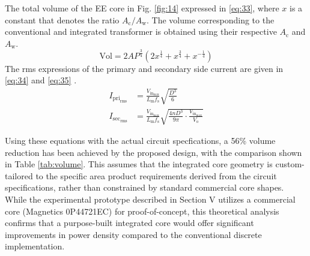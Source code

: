 \documentclass[lettersize,journal]{IEEEtran}
\begin{document}
The total volume of the EE core in Fig. \ref{fig:14} expressed in \eqref{eq:33}, where $x$ is a constant that denotes the ratio $A_{\mathrm{c}}/A_{\mathrm{w}}$. The volume corresponding to the conventional and integrated transformer is obtained using their respective $A_{\mathrm{c}}$ and $A_{\mathrm{w}}$.
\begin{equation}
\label{eq:33}
\mathrm{Vol} = 2 AP^{\frac{3}{4}} (2 x^{\frac{1}{4}} + x^{\frac{3}{4}} + x^{-\frac{1}{4}})
\end{equation}
The rms expressions of the primary and secondary side current are given in \eqref{eq:34} and \eqref{eq:35} \cite{ref8}.
\begin{align}
I_{\mathrm{pri}_{\mathrm{rms}}} &= \frac{V_{\mathrm{in}_{\mathrm{max}}}}{L_{\mathrm{m}} f_{\mathrm{s}}} \sqrt{\frac{D^3}{6}} \label{eq:34}\\
I_{\mathrm{sec}_{\mathrm{rms}}} &= \frac{V_{\mathrm{in}_{\mathrm{max}}}}{L_{\mathrm{m}} f_{\mathrm{s}}} \sqrt{\frac{4 n D^3}{9 \pi} \cdot \frac{V_{\mathrm{in}_{\mathrm{max}}}}{V_{\mathrm{o}}}} \label{eq:35}
\end{align}

Using these equations with the actual circuit specfications, a 56\% volume reduction has been achieved by the proposed design, with the comparison shown in Table \ref{tab:volume}. This assumes that the integrated core geometry is custom-tailored to the specific area product requirements derived from the circuit specifications, rather than constrained by standard commercial core shapes. While the experimental prototype described in Section V utilizes a commercial core (Magnetics 0P44721EC) for proof-of-concept, this theoretical analysis confirms that a purpose-built integrated core would offer significant improvements in power density compared to the conventional discrete implementation.
\end{document}
